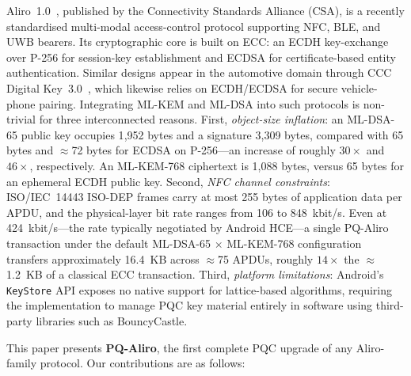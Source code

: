 Aliro~1.0~\cite{CSA:Aliro10}, published by the Connectivity Standards Alliance (CSA), is a recently standardised multi-modal access-control protocol supporting NFC, BLE, and UWB bearers. Its cryptographic core is built on ECC: an ECDH key-exchange over P-256 for session-key establishment and ECDSA for certificate-based entity authentication. Similar designs appear in the automotive domain through CCC Digital Key~3.0~\cite{CCC:DigKey3}, which likewise relies on ECDH/ECDSA for secure vehicle-phone pairing. Integrating ML-KEM and ML-DSA into such protocols is non-trivial for three interconnected reasons. First, \emph{object-size inflation}: an ML-DSA-65 public key occupies 1{,}952 bytes and a signature 3{,}309 bytes, compared with 65 bytes and $\approx$72 bytes for ECDSA on P-256---an increase of roughly $30\times$ and $46\times$, respectively. An ML-KEM-768 ciphertext is 1{,}088 bytes, versus 65 bytes for an ephemeral ECDH public key. Second, \emph{NFC channel constraints}: ISO/IEC~14443 ISO-DEP frames carry at most 255 bytes of application data per APDU, and the physical-layer bit rate ranges from 106 to 848~kbit/s. Even at 424~kbit/s---the rate typically negotiated by Android HCE---a single PQ-Aliro transaction under the default ML-DSA-65 $\times$ ML-KEM-768 configuration transfers approximately 16.4~KB across $\approx$75 APDUs, roughly $14\times$ the $\approx$1.2~KB of a classical ECC transaction. Third, \emph{platform limitations}: Android's \texttt{KeyStore} API exposes no native support for lattice-based algorithms, requiring the implementation to manage PQC key material entirely in software using third-party libraries such as BouncyCastle.

This paper presents \textbf{PQ-Aliro}, the first complete PQC upgrade of any Aliro-family protocol. Our contributions are as follows:

